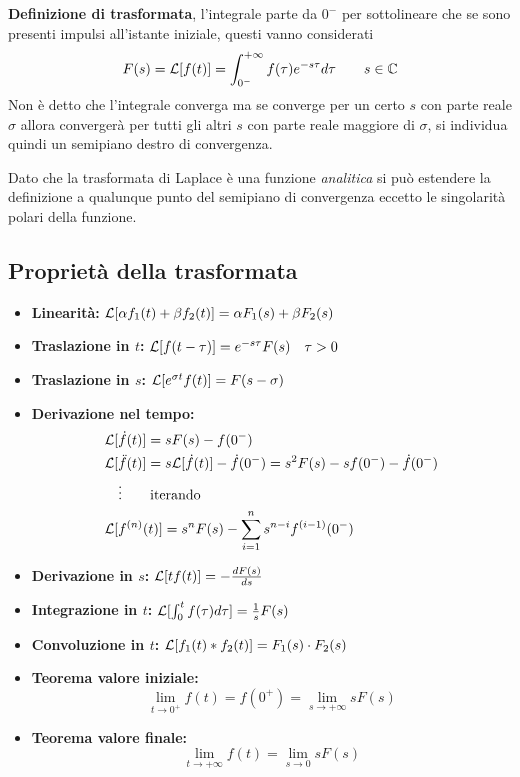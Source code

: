 \textbf{Definizione di trasformata}, l'integrale parte da $0^-$ per
sottolineare che se sono presenti impulsi all'istante iniziale, questi vanno
considerati
$$
F(s)=\mathcal{L}[f(t)] = \int_{0^-}^{+\infty} f(\tau)e^{-s\tau} d\tau \qquad s
\in \mathbb{C}
$$
Non è detto che l'integrale converga ma se converge per un certo $s$ con
parte reale $\sigma$ allora convergerà per tutti gli altri $s$ con parte
reale maggiore di $\sigma$, si individua quindi un semipiano destro di
convergenza.

Dato che la trasformata di Laplace è una funzione \textit{analitica} si può
estendere la definizione a qualunque punto del semipiano di convergenza eccetto
le singolarità polari della funzione.

\subsection{Proprietà della trasformata}
\begin{itemize}
 \item \textbf{Linearità:} $
  \mathcal{L} [\alpha f_1(t) + \beta f_2(t)] = \alpha F_1(s) + \beta F_2(s)
 $
 \item \textbf{Traslazione in $t$:} $
 \mathcal{L}[ f(t-\tau)  ] = e^{-s\tau}F(s) \quad \tau>0
 $
 \item \textbf{Traslazione in $s$:} $
 \mathcal{L}[e^{\sigma t}f(t)] = F(s-\sigma)
 $
 \item \textbf{Derivazione nel tempo:}
 $$\begin{aligned}
  \mathcal{L}[&\dot{f}(t)]  = sF(s) - f(0^{-})\\
 \mathcal{L}[&\ddot{f}(t)] = s\mathcal{L}[\dot f(t)] - \dot{f}(0^-) = s^2 F(s) - sf(0^-) -
\dot{f}(0^-)\\
&\vdots \qquad \text{iterando}\\
\mathcal{L}[&f^{(n)}(t)]= s^nF(s) - \sum_{i=1}^n s^{n-i}f^{(i-1)}(0^-)
 \end{aligned}$$
 \item \textbf{Derivazione in $s$:} $\mathcal{L} [tf(t)]=
 -\frac{dF(s)}{ds}
 $
 \item \textbf{Integrazione in $t$:} $
 \mathcal{L}[\int_0^tf(\tau)d\tau] = \frac{1}{s}F(s)
 $
 \item \textbf{Convoluzione in $t$:} $
 \mathcal{L}[f_1(t)*f_2(t)] = F_1(s)\cdot F_2(s)
 $
 \item \textbf{Teorema valore iniziale:} $$
 \lim_{t\to 0^+} f(t) = f(0^+) = \lim_{s\to +\infty} sF(s)
 $$
 \item \textbf{Teorema valore finale:} $$
 \lim_{t\to + \infty} f(t) = \lim_{s\to 0} s F(s)
 $$
\end{itemize}

